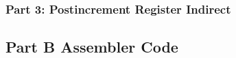 \documentclass[letterpaper]{article}
\begin{document}
  \subsubsection{Part 3: Postincrement Register Indirect}
  \vspace{2cm}
  \noindent{}
\newpage


  \subsection{Part B Assembler Code}
    
\newpage
\end{document}
